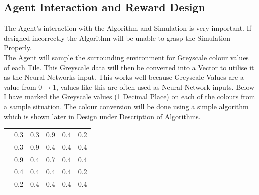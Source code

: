 \begin{flushleft}
        \subsection{Agent Interaction and Reward Design}
            The Agent's interaction with the Algorithm and Simulation is very important. If designed incorrectly the Algorithm will be unable 
            to grasp the Simulation Properly. \\
            \vspace{0.2cm}
            The Agent will sample the surrounding environment for Greyscale colour values of each Tile. This Greyscale data will then be
            converted into a Vector to utilise it as the Neural Networks input. This works well because Greyscale Values are a value 
            from $0\to 1$, values like this are often used as Neural Network inputs. Below I have marked the Greyscale values (1 Decimal Place)
            on each of the colours from a sample situation. The colour conversion will be done using a simple algorithm which is shown later
            in Design under Description of Algorithms.

            \begin{center}
                \begin{tabular}{m{0cm} C{1cm} C{1cm} C{1cm} C{1cm} C{1cm}}
                        \rule{0pt}{1.2cm}%
                        &0.3 & 0.3 & 0.9 & 0.4 & 0.2 \\
                        \rule{0pt}{1.2cm}%
                        &0.3 & 0.9 & 0.4 & 0.4 & 0.4 \\
                        \rule{0pt}{1.2cm}%
                        &0.9 & 0.4 & 0.7 & 0.4 & 0.4 \\
                        \rule{0pt}{1.2cm}%
                        &0.4 & 0.4 & 0.4 & 0.4 & 0.2 \\
                        \rule{0pt}{1.2cm}%
                        &0.2  & 0.4 & 0.4 & 0.4 & 0.4 \\
                \end{tabular}
            \end{center}


\end{flushleft}
